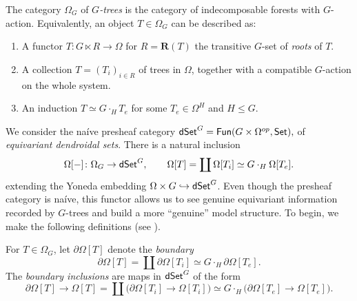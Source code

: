 \documentclass[a4paper,10pt
,draft
]{article}%
\renewcommand{\1}{\eta}%
\begin{document}
\begin{definition}
      The category $\Omega_G$ of \textit{$G$-trees} is the category of indecomposable forests with $G$-action.
      Equivalently, an object $T \in \Omega_G$ can be described as:
      \begin{enumerate}
      \item A functor $T: G \ltimes R \to \Omega$ for $R = \mathbf R(T)$ the transitive $G$-set of \textit{roots} of $T$.
      \item A collection $T = (T_i)_{i \in R}$ of trees in $\Omega$, together with a compatible $G$-action on the whole system.
      \item An induction $T \simeq G \cdot_H T_e$ for some $T_e \in \Omega^H$ and $H \leq G$.
      \end{enumerate}
\end{definition}

We consider the na\'ive presheaf category 
$
\mathsf{dSet}^G = \mathsf{Fun}(G \times \Omega^{op}, \mathsf{Set}),
$
of \textit{equivariant dendroidal sets}.
There is a natural inclusion
\[
      \Omega[-] \colon \Omega_G \to \mathsf{dSet}^G,
      \qquad
      \Omega[T] = \coprod \Omega[T_i] \simeq G \cdot_H \Omega[T_e].
\]
extending the Yoneda embedding $\Omega \times G \hookrightarrow \mathsf{dSet}^G$.
Even though the presheaf category is na\'ive, this functor allows us to see genuine equivariant information recorded by $G$-trees
and build a more ``genuine'' model structure.
To begin, we make the following definitions (see \cite[\S 6]{Per_eds}).

\begin{definition}
      For $T \in \Omega_G$, let $\partial \Omega[T]$ denote the \textit{boundary}
      \[
            \partial \Omega[T] = \coprod \partial \Omega[T_i] \simeq G \cdot_H \partial \Omega[T_e].
      \]
      The \textit{boundary inclusions} are maps in $\mathsf{dSet}^G$ of the form
      \[
            \partial \Omega[T] \to \Omega[T] =
            \coprod \big( \partial \Omega[T_i] \to \Omega[T_i]\big) \simeq
            G \cdot_H \big( \partial \Omega[T_e] \to \Omega[T_e] \big).
      \]
\end{definition}
\end{document}
